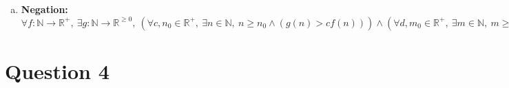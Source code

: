 \documentclass[12pt]{article}
\begin{document}
\begin{enumerate}[a.]
    \bigskip

    Then, it follows from above that $cn^2 \leq \frac{c}{3}n^4$ holds.

    \bigskip

    Then, because we know $n^4 \leq \frac{c}{3}n^4$, $165n^3 \leq \frac{c}{3}n^4$,
    and $cn^2 \leq \frac{c}{3}n^4$ are true, we can conclude that
    $n^4 + 165n^3 + cn^2 \leq cn^4$ is true.

    \bigskip

    Then,

    \begin{align}
        n^4 + 165n^3 + cn^2 &\leq cn^4\\
        n^4 + 165n^3 &\leq c(n^4 - n^2)
    \end{align}

    \bigskip

    Then, it follows from the definition of Big-Oh that the statement $n^4 + 165n^3
    \in \mathcal{O}(n^4 - n^2)$ is true.

    \item

    \textbf{Negation:} $\forall f: \mathbb{N} \to \mathbb{R}^{+},\:\exists g:\mathbb{N}
    \to \mathbb{R}^{\geq 0},\:(\forall c,n_0 \in \mathbb{R}^{+},\:\exists n \in \mathbb{N},
    \:n \geq n_0 \land (g(n) > cf(n))) \land (\forall d,m_0 \in \mathbb{R}^{+},\:\exists
    m \in \mathbb{N},\:m \geq m_0 \land (g(n) < cf(n)))$

\end{enumerate}

\section*{Question 4}
\end{document}

